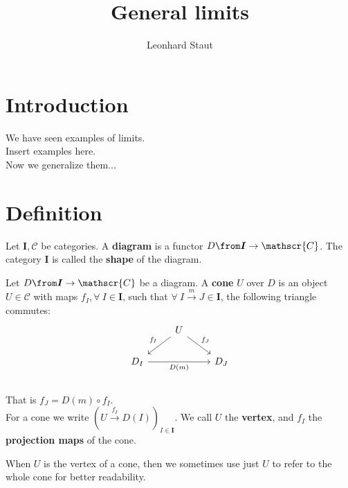 \def\pathToRoot{../../}

\title{General limits}
\author{Leonhard Staut}



\maketitle
\chapter{Introduction}
We have seen examples of limits.\\
Insert examples here.\\
Now we generalize them...
\chapter{Definition}

\begin{definition}
  Let $\bm{I}, \mathscr{C}$ be categories.
  A \textbf{diagram} is a functor $D \from \bm{I} \to \mathscr{C}$.
  The category $\bm{I}$ is called the \textbf{shape} of the diagram.
\end{definition}


\begin{definition}
  Let $D \from \bm{I} \to \mathscr{C}$ be a diagram.
  A \textbf{cone} $U$ over $D$ is an object $U \in \mathscr{C}$
  with maps $f_I, \forall\ I \in \bm{I}$, such that
  $\forall\ I \overset{m}{\to} J \in \bm{I}$, the following triangle commutes:
  \[
    \begin{tikzcd}
      & U \arrow[dl, swap, "f_I"] \arrow{dr}{f_J}&\\
      D_I \arrow[rr, swap, "D(m)"] & & D_J\\
    \end{tikzcd}
  \]
  That is $f_J = D(m) \circ f_I$.\\
  For a cone we write $(U \overset{f_I}{\to} D(I))_{I\in \bm{I}}$.
  We call $U$ the \textbf{vertex}, and $f_I$ the \textbf{projection maps} of the cone.
\end{definition}
\begin{remark}
  When $U$ is the vertex of a cone, then we sometimes use just $U$ to refer to the whole cone
  for better readability.
\end{remark}


